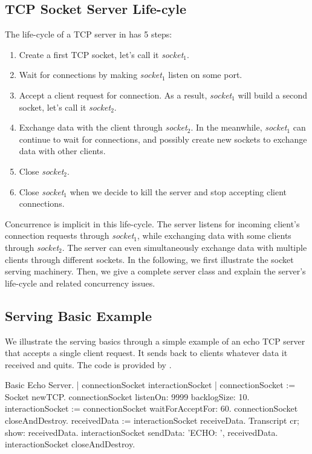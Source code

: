 \documentclass[a4paper,10pt,twoside]{book}
\begin{document}
\subsection{TCP Socket Server Life-cyle}
The life-cycle of a TCP server in \pharo  has 5 steps:
\begin{enumerate}
\item Create a first TCP socket, let's call it \textit{socket$_1$}.
\item Wait for connections by making \textit{socket$_1$}  listen on some port.
\item Accept a client request for connection. As a result, \textit{socket$_1$} will build a second socket, let's call it \textit{socket$_2$}.
\item Exchange data with the client through \textit{socket$_2$}. In the meanwhile, \textit{socket$_1$} can continue to wait for connections, and possibly create new sockets to exchange data with other clients. 
\item Close \textit{socket$_2$}.
\item Close \textit{socket$_1$} when we decide to kill the server and stop accepting client connections.
\end{enumerate}

Concurrence is implicit in this life-cycle.
The server listens for incoming client's connection requests through \textit{socket$_1$}, while exchanging data with some clients through \textit{socket$_2$}.
The server can even simultaneously exchange data with multiple clients through different sockets.
In the following, we first illustrate the socket serving machinery.
Then, we give a complete server class and explain the server's life-cycle and related concurrency issues.

\subsection{Serving Basic Example}
We illustrate the serving basics through a simple example of an echo TCP server that accepts a single client request.
It sends back to clients whatever data it received and quits.
The code is provided by .

\begin{script}[servingBasicExample]{Basic Echo Server.}
| connectionSocket interactionSocket |
connectionSocket := Socket newTCP.
connectionSocket listenOn: 9999 backlogSize: 10.
interactionSocket := connectionSocket waitForAcceptFor: 60.
connectionSocket closeAndDestroy.
receivedData := interactionSocket receiveData.
Transcript cr; show: receivedData.
interactionSocket sendData: 'ECHO: ', receivedData.
interactionSocket closeAndDestroy.
\end{script}
\end{document}
